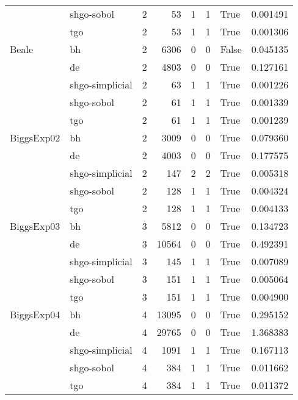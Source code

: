 \begin{longtable}{llrrrrlr}
         & shgo-sobol &     2 &       53 &      1 &       1 &    True &    0.001491 \\
         & tgo &     2 &       53 &      1 &       1 &    True &    0.001306 \\
Beale & bh &     2 &     6306 &      0 &       0 &   False &    0.045135 \\
         & de &     2 &     4803 &      0 &       0 &    True &    0.127161 \\
         & shgo-simplicial &     2 &       63 &      1 &       1 &    True &    0.001226 \\
         & shgo-sobol &     2 &       61 &      1 &       1 &    True &    0.001339 \\
         & tgo &     2 &       61 &      1 &       1 &    True &    0.001239 \\
BiggsExp02 & bh &     2 &     3009 &      0 &       0 &    True &    0.079360 \\
         & de &     2 &     4003 &      0 &       0 &    True &    0.177575 \\
         & shgo-simplicial &     2 &      147 &      2 &       2 &    True &    0.005318 \\
         & shgo-sobol &     2 &      128 &      1 &       1 &    True &    0.004324 \\
         & tgo &     2 &      128 &      1 &       1 &    True &    0.004133 \\
BiggsExp03 & bh &     3 &     5812 &      0 &       0 &    True &    0.134723 \\
         & de &     3 &    10564 &      0 &       0 &    True &    0.492391 \\
         & shgo-simplicial &     3 &      145 &      1 &       1 &    True &    0.007089 \\
         & shgo-sobol &     3 &      151 &      1 &       1 &    True &    0.005064 \\
         & tgo &     3 &      151 &      1 &       1 &    True &    0.004900 \\
BiggsExp04 & bh &     4 &    13095 &      0 &       0 &    True &    0.295152 \\
         & de &     4 &    29765 &      0 &       0 &    True &    1.368383 \\
         & shgo-simplicial &     4 &     1091 &      1 &       1 &    True &    0.167113 \\
         & shgo-sobol &     4 &      384 &      1 &       1 &    True &    0.011662 \\
         & tgo &     4 &      384 &      1 &       1 &    True &    0.011372 \\

\end{longtable}
